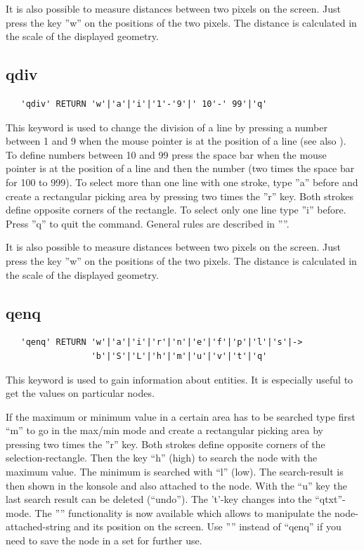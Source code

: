 \documentclass{article}
\begin{document}
It is also possible to measure distances between two pixels on the screen. Just press the key ''w'' on the positions of the two pixels. The distance is calculated in the scale of the displayed geometry.

\subsection{\label{qdiv}qdiv}
\begin{verbatim}
   'qdiv' RETURN 'w'|'a'|'i'|'1'-'9'|' 10'-' 99'|'q' 
\end{verbatim}
This keyword is used to change the division of a line by pressing a number between 1 and 9 when the mouse pointer is at the position of a line (see also ). To define numbers between 10 and 99 press the space bar when the mouse pointer is at the position of a line and then the number (two times the space bar for 100 to 999). To select more than one line with one stroke, type ''a'' before and create a rectangular picking area by pressing two times the ''r'' key. Both strokes define opposite corners of the rectangle. To select only one line type ''i'' before. Press ''q'' to quit the command. General rules are described in ''''. 

It is also possible to measure distances between two pixels on the screen. Just press the key ''w'' on the positions of the two pixels. The distance is calculated in the scale of the displayed geometry.

\subsection{\label{qenq}qenq}
\begin{verbatim}
   'qenq' RETURN 'w'|'a'|'i'|'r'|'n'|'e'|'f'|'p'|'l'|'s'|->
                 'b'|'S'|'L'|'h'|'m'|'u'|'v'|'t'|'q' 
\end{verbatim}
This keyword is used to gain information about entities. It is especially useful to get the values on particular nodes.

If the maximum or minimum value in a certain area has to be searched type first ``m'' to go in the max/min mode and create a rectangular picking area by pressing two times the ''r'' key. Both strokes define opposite corners of the selection-rectangle. Then the key ``h'' (high) to search the node with the maximum value. The minimum is searched with ``l'' (low). The search-result is then shown in the konsole and also attached to the node. With the ``u'' key the last search result can be deleted (``undo''). The 't'-key changes into the ``qtxt''-mode. The '''' functionality is now available which allows to manipulate the node-attached-string and its position on the screen. Use '''' instead of ``qenq'' if you need to save the node in a set for further use.
\end{document}
